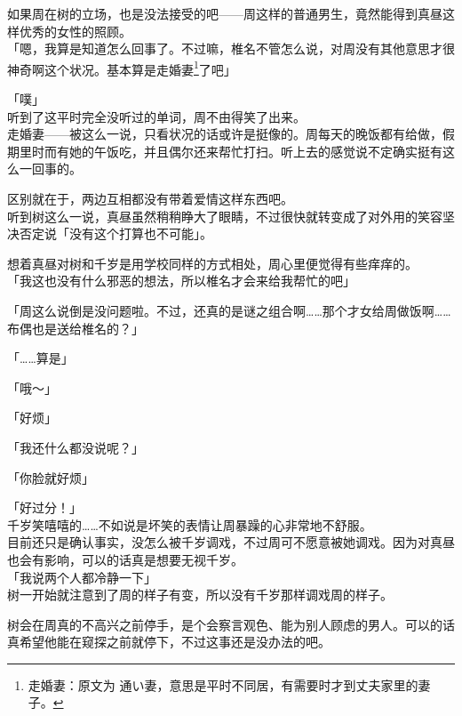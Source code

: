 如果周在树的立场，也是没法接受的吧——周这样的普通男生，竟然能得到真昼这样优秀的女性的照顾。\\

「嗯，我算是知道怎么回事了。不过嘛，椎名不管怎么说，对周没有其他意思才很神奇啊这个状况。基本算是走婚妻\footnote{走婚妻：原文为 {\jpfont 通い妻}，意思是平时不同居，有需要时才到丈夫家里的妻子。}了吧」

「噗」\\

听到了这平时完全没听过的单词，周不由得笑了出来。\\

走婚妻——被这么一说，只看状况的话或许是挺像的。周每天的晚饭都有给做，假期里时而有她的午饭吃，并且偶尔还来帮忙打扫。听上去的感觉说不定确实挺有这么一回事的。

区别就在于，两边互相都没有带着爱情这样东西吧。\\

听到树这么一说，真昼虽然稍稍睁大了眼睛，不过很快就转变成了对外用的笑容坚决否定说「没有这个打算也不可能」。

想着真昼对树和千岁是用学校同样的方式相处，周心里便觉得有些痒痒的。\\

「我这也没有什么邪恶的想法，所以椎名才会来给我帮忙的吧」

「周这么说倒是没问题啦。不过，还真的是谜之组合啊……那个才女给周做饭啊……布偶也是送给椎名的？」

「……算是」

「哦～」

「好烦」

「我还什么都没说呢？」

「你脸就好烦」

「好过分！」\\

千岁笑嘻嘻的……不如说是坏笑的表情让周暴躁的心非常地不舒服。\\

目前还只是确认事实，没怎么被千岁调戏，不过周可不愿意被她调戏。因为对真昼也会有影响，可以的话真是想要无视千岁。\\

「我说两个人都冷静一下」\\

树一开始就注意到了周的样子有变，所以没有千岁那样调戏周的样子。

树会在周真的不高兴之前停手，是个会察言观色、能为别人顾虑的男人。可以的话真希望他能在窥探之前就停下，不过这事还是没办法的吧。\\

